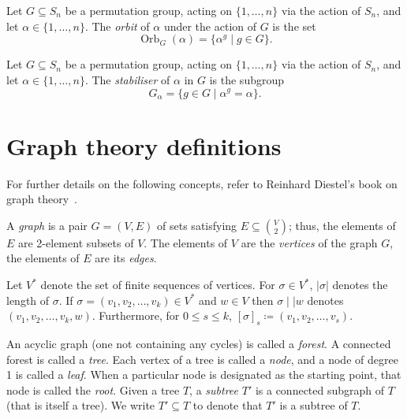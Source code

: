 \vspace{1em}


\begin{definition}\label{def:orbit}
    Let $G \subseteq S_n$ be a permutation group, acting on $\{1,\ldots,n\}$ via the action of $S_n$, and let $\alpha \in \{1,\ldots,n\}$. The \emph{orbit} of $\alpha$ under the 
    action of $G$ is the set
    \[
    \operatorname{Orb}_G(\alpha) = \{\alpha^g \mid g \in G\}.
    \]
    \end{definition}
    \vspace{1em}
    
    \begin{definition}\label{def:stabiliser}
        Let $G \subseteq S_n$ be a permutation group, acting on $\{1,\ldots,n\}$ via the action of $S_n$, and let $\alpha \in \{1,\ldots,n\}$. 
        The \emph{stabiliser} of $\alpha$ in $G$ is the subgroup
        \[
        G_\alpha = \{g \in G \mid \alpha^g = \alpha\}.
        \]
        \end{definition}
\section{Graph theory definitions}

For further details on the following concepts, refer to Reinhard Diestel’s book on graph theory~\cite{diestel2025}.

\vspace{0.4em}

\begin{definition}\label{def:graph}
A \emph{graph} is a pair $G = (V, E)$ of sets satisfying $E \subseteq \binom {V}{2}$; thus, the elements of $E$ are 2-element subsets of $V$. The elements of $V$ are the \emph{vertices} of the graph $G$, the elements of $E$ are its \emph{edges}.

Let \emph{$V^*$} denote the set of finite sequences of vertices. For $\sigma \mathrel{\in}V^*$, $|\sigma|$ denotes the length of $\sigma$. If  $\sigma= (v_1, v_2, \ldots,v_k)  \mathrel{\in}V^*$ and $w  \mathrel{\in}V$ then  $\sigma\mid\mid w$  denotes $(v_1, v_2, \ldots ,v_k, w)$. Furthermore, for $0 \leq s \leq k$, ${[\sigma]}_s  \coloneqq(v_1, v_2, \ldots,v_s)$. 


An acyclic graph (one not containing any cycles) is called a \emph{forest}. 
A connected forest is called a \emph{tree}\label{def:tree}. Each vertex of a tree is called 
a \emph{node}, and a node of degree 1 is called a \emph{leaf}. When a particular node is designated as the starting point, 
that node is called the \emph{root}. Given a tree $T$, a \emph{subtree} $T'$ 
is a connected subgraph of $T$ (that is itself a tree). We write $T' \subseteq T$ 
to denote that $T'$ is a subtree of $T$.
\end{definition}


